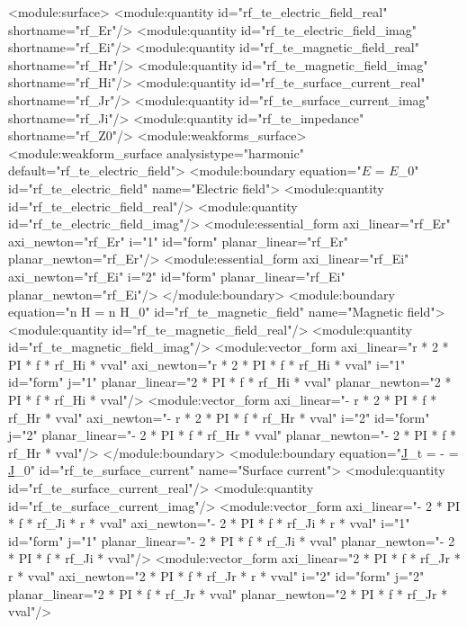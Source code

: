 \documentclass[12pt,a4paper,oneside]{article}
\numberwithin{equation}{section} %
\numberwithin{figure}{section} %
\numberwithin{table}{section} %
\newcommand{\faz}[1]{{\underline{#1}}} %
\newcommand{\vecfaz}[1]{\mbox{\underline{\boldmath$#1$}}} %
\begin{document}
\begin{spverbatim}
 <module:surface>
    <module:quantity id="rf_te_electric_field_real" shortname="rf_Er"/>
    <module:quantity id="rf_te_electric_field_imag" shortname="rf_Ei"/>
    <module:quantity id="rf_te_magnetic_field_real" shortname="rf_Hr"/>
    <module:quantity id="rf_te_magnetic_field_imag" shortname="rf_Hi"/>
    <module:quantity id="rf_te_surface_current_real" shortname="rf_Jr"/>
    <module:quantity id="rf_te_surface_current_imag" shortname="rf_Ji"/>
    <module:quantity id="rf_te_impedance" shortname="rf_Z0"/>
    <module:weakforms_surface>
      <module:weakform_surface analysistype="harmonic" default="rf_te_electric_field">
        <module:boundary equation="\vecfaz{E} = \vecfaz{E}_0" id="rf_te_electric_field" name="Electric field">
          <module:quantity id="rf_te_electric_field_real"/>
          <module:quantity id="rf_te_electric_field_imag"/>
          <module:essential_form axi_linear="rf_Er" axi_newton="rf_Er" i="1" id="form" planar_linear="rf_Er" planar_newton="rf_Er"/>
          <module:essential_form axi_linear="rf_Ei" axi_newton="rf_Ei" i="2" id="form" planar_linear="rf_Ei" planar_newton="rf_Ei"/>
        </module:boundary>
        <module:boundary equation="n \times H = n \times H_0" id="rf_te_magnetic_field" name="Magnetic field">
          <module:quantity id="rf_te_magnetic_field_real"/>
          <module:quantity id="rf_te_magnetic_field_imag"/>
          <module:vector_form axi_linear="r * 2 * PI * f * rf_Hi * vval" axi_newton="r * 2 * PI * f * rf_Hi * vval" i="1" id="form" j="1" planar_linear="2 * PI * f * rf_Hi * vval" planar_newton="2 * PI * f * rf_Hi * vval"/>
          <module:vector_form axi_linear="- r * 2 * PI * f * rf_Hr * vval" axi_newton="- r * 2 * PI * f * rf_Hr * vval" i="2" id="form" j="2" planar_linear="- 2 * PI * f * rf_Hr * vval" planar_newton="- 2 * PI * f * rf_Hr * vval"/>
        </module:boundary>
        <module:boundary equation="\faz{J}_{t} = -  \frac{\partial \vecfaz{E}}{\partial n_0} = \faz{J}_0" id="rf_te_surface_current" name="Surface current">
          <module:quantity id="rf_te_surface_current_real"/>
          <module:quantity id="rf_te_surface_current_imag"/>
          <module:vector_form axi_linear="- 2 * PI * f * rf_Ji * r * vval" axi_newton="- 2 * PI * f * rf_Ji * r * vval" i="1" id="form" j="1" planar_linear="- 2 * PI * f * rf_Ji * vval" planar_newton="- 2 * PI * f * rf_Ji * vval"/>
          <module:vector_form axi_linear="2 * PI * f * rf_Jr * r * vval" axi_newton="2 * PI * f * rf_Jr * r * vval" i="2" id="form" j="2" planar_linear="2 * PI * f * rf_Jr * vval" planar_newton="2 * PI * f * rf_Jr * vval"/>

\end{spverbatim}
\end{document}
